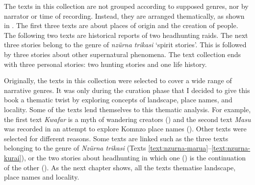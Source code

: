 The texts in this collection are not grouped according to supposed genres, nor by narrator or time of recording. Instead, they are arranged thematically, as shown in . The first three texts are about places of origin and the creation of people. The following two texts are historical reports of two headhunting raids. The next three stories belong to the genre of \textit{nzürna trikasi} `spirit stories'. This is followed by three stories about other supernatural phenomena. The text collection ends with three personal stories: two hunting stories and one life history.

Originally, the texts in this collection were selected to cover a wide range of narrative genres. It was only during the curation phase that I decided to give this book a thematic twist by exploring concepts of landscape, place names, and locality. Some of the texts lend themselves to this thematic analysis. For example, the first text \textit{Kwafar} is a myth of wandering creators () and the second text \textit{Masu} was recorded in an attempt to explore Komnzo place names (). Other texts were selected for different reasons. Some texts are linked such as the three texts belonging to the genre of \textit{Nzürna trikasi} (Texts \ref{text:nzurna-marua}--\ref{text:nzurna-kurai}), or the two stories about headhunting in which one () is the continuation of the other (). As the next chapter shows, all the texts thematise landscape, place names and locality.

